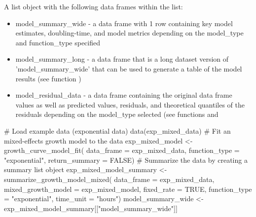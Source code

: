 \documentclass[a4paper]{book}
\begin{document}
\begin{Value}
A list object with the following data frames within the list:
\begin{itemize}

\item{} model\_summary\_wide - a data frame with 1 row containing
key model estimates, doubling-time, and model metrics depending
on the model\_type and function\_type specified
\item{} model\_summary\_long - a data frame that is a long dataset version of
'model\_summary\_wide' that can be used to generate a table of the model
results (see function )
\item{} model\_residual\_data - a data frame containing the original data
frame values as well as predicted values, residuals, and theoretical
quantiles of the residuals depending on the model\_type selected
(see functions  and

\end{itemize}

\end{Value}
%
\begin{SeeAlso}
\end{SeeAlso}
%
\begin{Examples}
\begin{ExampleCode}
# Load example data (exponential data)
data(exp_mixed_data)
# Fit an mixed-effects growth model to the data
exp_mixed_model <- growth_curve_model_fit(
data_frame = exp_mixed_data,
function_type = "exponential",
return_summary = FALSE)
# Summarize the data by creating a summary list object
exp_mixed_model_summary <- summarize_growth_model_mixed(
data_frame = exp_mixed_data,
mixed_growth_model = exp_mixed_model,
fixed_rate = TRUE,
function_type = "exponential",
time_unit = "hours")
model_summary_wide <- exp_mixed_model_summary[["model_summary_wide"]]
\end{ExampleCode}
\end{Examples}
\printindex{}
\end{document}

